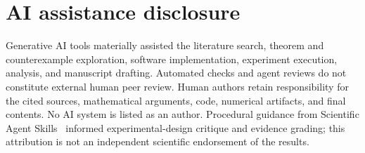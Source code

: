 \section*{AI assistance disclosure}

Generative AI tools materially assisted the literature search, theorem and
counterexample exploration, software implementation, experiment execution,
analysis, and manuscript drafting. Automated checks and agent reviews
do not constitute external human peer review. Human authors retain
responsibility for the cited sources, mathematical arguments, code, numerical
artifacts, and final contents. No AI system is listed as an author.
Procedural guidance from Scientific Agent Skills~\citep{kassis2026scientificagentskillslibrary}
informed experimental-design critique and evidence grading; this attribution
is not an independent scientific endorsement of the results.
